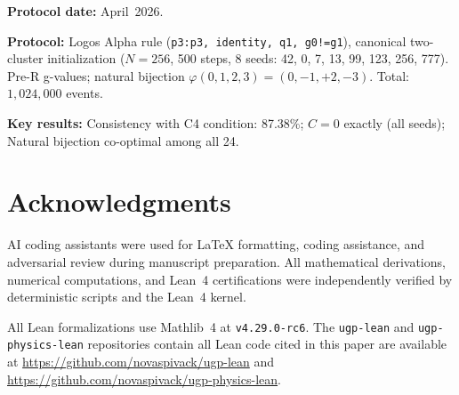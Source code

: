\documentclass[12pt]{article}
\theoremstyle{remark}
\begin{document}
\textbf{Protocol date:} April~2026.

\textbf{Protocol:} Logos Alpha rule (\texttt{p3:p3, identity, q1, g0!=g1}),
canonical two-cluster initialization ($N = 256$, 500 steps, 8 seeds: 42, 0, 7,
13, 99, 123, 256, 777).  Pre-R g-values; natural bijection
$\varphi(0,1,2,3) = (0,-1,+2,-3)$.  Total: $1{,}024{,}000$ events.

\textbf{Key results:}
Consistency with C4 condition: 87.38\%;
$C = 0$ exactly (all seeds);
Natural bijection co-optimal among all 24.

\section*{Acknowledgments}

AI coding assistants were used for LaTeX formatting, coding assistance, and adversarial review during manuscript preparation. All mathematical derivations, numerical computations, and Lean~4 certifications were independently verified by deterministic scripts and the Lean~4 kernel.

All Lean formalizations use Mathlib~4 at \texttt{v4.29.0-rc6}.  The
\texttt{ugp-lean} and \texttt{ugp-physics-lean} repositories contain all Lean
code cited in this paper are available at \url{https://github.com/novaspivack/ugp-lean} and \url{https://github.com/novaspivack/ugp-physics-lean}.



\end{document}
